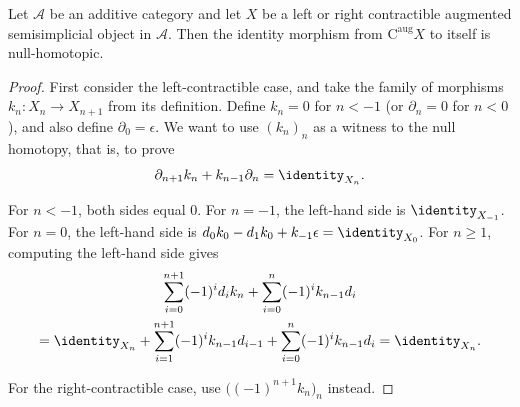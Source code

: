 \begin{proposition}\label{prop:contractible-null-homotopic}
	Let $\mathcal{A}$ be an additive category and let $X$ be a left or right
	contractible augmented semisimplicial object in $\mathcal{A}$. Then the
	identity morphism from $\mathrm{C}^{\mathrm{aug}}X$ to itself is
	null-homotopic.
\end{proposition}
\begin{proof}
	First consider the left-contractible case, and take the family of
	morphisms $k_n:X_n\to X_{n+1}$ from its definition. Define $k_n=0$ for
	$n<-1$ (or $\partial_n=0$ for $n<0$), and also define
	$\partial_0=\epsilon$. We want to use $(k_n)_n$ as a witness to the null
	homotopy, that is, to prove
	\[
	\partial_{n+1}k_n+k_{n-1}\partial_n=\identity_{X_n}.
	\]

	For $n<-1$, both sides equal $0$. For $n=-1$, the left-hand side is
	$\identity_{X_{-1}}$. For $n=0$, the left-hand side is
	$d_0k_0-d_1k_0+k_{-1}\epsilon=\identity_{X_0}$. For $n\geq1$,
	computing the left-hand side gives
	\begin{multline*}
		\sum_{i=0}^{n+1}(-1)^id_ik_n
		+\sum_{i=0}^n(-1)^ik_{n-1}d_i\\
		=\identity_{X_n}
		+\sum_{i=1}^{n+1}(-1)^ik_{n-1}d_{i-1}
		+\sum_{i=0}^n(-1)^ik_{n-1}d_i
		=\identity_{X_n}.
	\end{multline*}

	For the right-contractible case, use
	$\bigl((-1)^{n+1}k_n\bigr)_n$ instead.
\end{proof}
